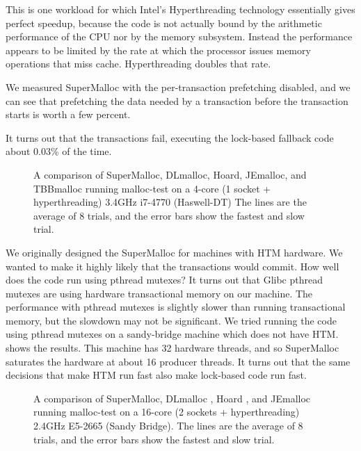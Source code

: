 \documentclass[pldi]{sigplanconf-pldi15}
\begin{document}
This is one workload for which Intel's Hyperthreading technology
essentially gives perfect speedup, because the code is not actually
bound by the arithmetic performance of the CPU nor by the memory
subsystem.  Instead the performance appears to be limited by the rate
at which the processor issues memory operations that miss cache.
Hyperthreading doubles that rate.

We measured SuperMalloc with the per-transaction
prefetching disabled, and we can see that prefetching the data needed
by a transaction before the transaction starts is worth a few percent.

It turns out that the transactions fail, executing the lock-based
fallback code about $0.03$\% of the time.

\begin{figure}

\caption{A comparison of SuperMalloc, DLmalloc, Hoard,
  JEmalloc, and TBBmalloc running malloc-test
  on a 4-core (1 socket + hyperthreading) 3.4GHz i7-4770 (Haswell-DT)
  The lines are the average of 8 trials, and the error bars
  show the fastest and slow trial.}
\label{fig:datahtm}
\vspace*{-3ex}
\end{figure}

We originally designed the SuperMalloc for machines with HTM hardware.
We wanted to make it highly likely that the transactions would commit.
How well does the code run using pthread mutexes?  It turns out that
Glibc pthread mutexes are using hardware transactional memory on our
machine.  The performance with pthread mutexes is slightly slower than
running transactional memory, but the slowdown may not be significant.
We tried running the code using pthread mutexes on a sandy-bridge
machine which does not have HTM.   shows the
results. This machine has 32 hardware threads, and so SuperMalloc
saturates the hardware at about 16 producer threads.  It turns out
that the same decisions that make HTM run fast also make lock-based
code run fast.

\begin{figure}

\caption{A comparison of SuperMalloc, DLmalloc \cite{Lea96}, Hoard
  \cite{BergerMcBl00}, and JEmalloc~\cite{Evans06} running malloc-test
  on a 16-core (2 sockets + hyperthreading) 2.4GHz E5-2665 (Sandy
  Bridge).  The lines are the average of 8 trials, and the error bars
  show the fastest and slow trial.}
\label{fig:datalock}
\vspace*{-3ex}
\end{figure}
\end{document}
